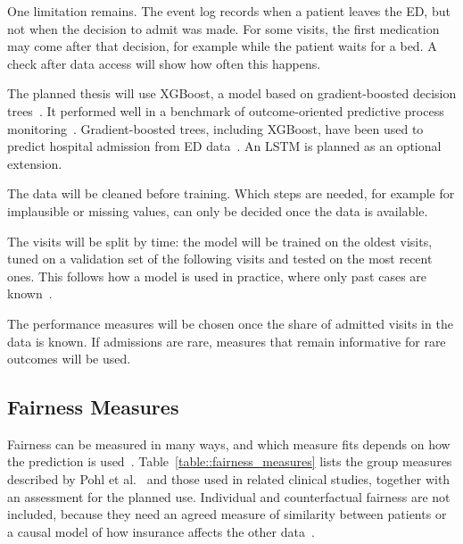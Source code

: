 One limitation remains. The event log records when a patient leaves the ED, but not when the decision to admit was made. For some visits, the first medication may come after that decision, for example while the patient waits for a bed. A check after data access will show how often this happens.

The planned thesis will use XGBoost, a model based on gradient-boosted decision trees~\cite{chen2016xgboost}. It performed well in a benchmark of outcome-oriented predictive process monitoring~\cite{teinemaa2019outcome}. Gradient-boosted trees, including XGBoost, have been used to predict hospital admission from ED data~\cite{xie2022benchmarking,lett2025intersectional,king2022machine}. An LSTM is planned as an optional extension.

The data will be cleaned before training. Which steps are needed, for example for implausible or missing values, can only be decided once the data is available.

The visits will be split by time: the model will be trained on the oldest visits, tuned on a validation set of the following visits and tested on the most recent ones. This follows how a model is used in practice, where only past cases are known~\cite{teinemaa2019outcome}.

The performance measures will be chosen once the share of admitted visits in the data is known. If admissions are rare, measures that remain informative for rare outcomes will be used.

\subsection{Fairness Measures}\label{subsection::fairness_measures}

Fairness can be measured in many ways, and which measure fits depends on how the prediction is used~\cite{rajkomar2018ensuring}. Table~\ref{table::fairness_measures} lists the group measures described by Pohl et al.~\cite{pohl2023discrimination} and those used in related clinical studies, together with an assessment for the planned use. Individual and counterfactual fairness are not included, because they need an agreed measure of similarity between patients or a causal model of how insurance affects the other data~\cite{pohl2023discrimination,desantis2027fairness}.

